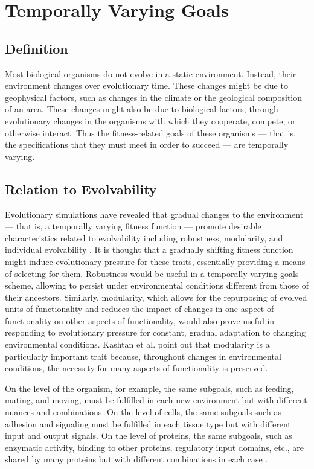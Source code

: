 \section{Temporally Varying Goals} \label{sec:tvg}
\subsection{Definition}
Most biological organisms do not evolve in a static environment. Instead, their environment changes over evolutionary time. These changes might be due to geophysical factors, such as changes in the climate or the geological composition of an area. These changes might also be due to biological factors, through evolutionary changes in the organisms with which they cooperate, compete, or otherwise interact. Thus the fitness-related goals of these organisms --- that is, the specifications that they must meet in order to succeed --- are temporally varying.

\subsection{Relation to Evolvability}

Evolutionary simulations have revealed that gradual changes to the environment  --- that is, a temporally varying fitness function --- promote desirable characteristics related to evolvability including robustness, modularity, and individual evolvability \cite{Kashtan2007VaryingEvolution, Wilder2015ReconcilingEvolvability}. It is thought that a gradually shifting fitness function might induce evolutionary pressure for these traits, essentially providing a means of selecting for them. Robustness would be useful in a temporally varying goals scheme, allowing to persist under environmental conditions different from those of their ancestors.\mindmapmark{\robustnesstemporallyvaryinggoals} Similarly, modularity, which allows for the repurposing of evolved units of functionality and reduces the impact of changes in one aspect of functionality on other aspects of functionality, would also prove useful in responding to evolutionary pressure for constant, gradual adaptation to changing environmental conditions.\mindmapmark{\modularitytemporallyvaryinggoals} Kashtan et al. point out that modularity is a particularly important trait because, throughout changes in environmental conditions, the necessity for many aspects of functionality is preserved.

\begin{displayquote}
On the level of the organism, for example, the same subgoals, such as feeding, mating, and moving, must be fulfilled in each new environment but with different nuances and combinations. On the level of cells, the same subgoals such as adhesion and signaling must be fulfilled in each tissue type but with different input and output signals. On the level of proteins, the same subgoals, such as enzymatic activity, binding to other proteins, regulatory input domains, etc., are shared by many proteins but with different combinations in each case \cite{Kashtan2007VaryingEvolution}.
\end{displayquote}

